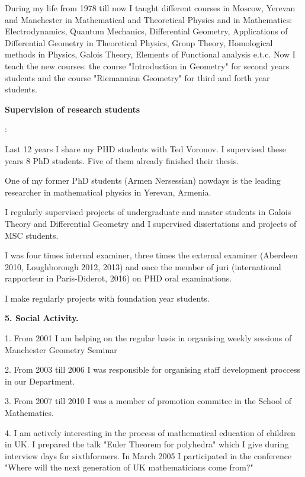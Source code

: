 \documentclass[12pt]{article}
\def\m {\medskip}
\begin{document}
  During my life from 1978 till now I  taught different courses in Moscow,  Yerevan and Manchester in
  Mathematical and Theoretical Physics and
  in Mathematics: Electrodynamics, Quantum Mechanics, Differential Geometry,
Applications of Differential Geometry in Theoretical Physics, Group Theory, Homological methods in Physics,
  Galois Theory, Elements of Functional analysis e.t.c.
   Now I  teach the new courses: the course 
  "Introduction in Geometry" for second years 
students and the course "Riemannian Geometry" for 
third and forth year students.




\m



 \centerline {\bf  Supervision of research students}:


  Last 12 years I share my PHD students with Ted Voronov.
   I supervised these years 8 PhD students. Five of them already 
finished their thesis.

 One of my former PhD students (Armen Nersessian) nowdays is the leading researcher
 in mathematical physics in Yerevan, Armenia.


   I regularly supervised projects of undergraduate and master students in
  Galois Theory and Differential Geometry and I supervised
  dissertations and projects of MSC students. 


  I was four times internal examiner,
 three times the external examiner 
(Aberdeen 2010, Loughborough 2012, 2013)
and once the member of juri 
(international rapporteur in Paris-Diderot, 2016)
  on PHD oral examinations.

 I make regularly projects with foundation year students.

 \begin{center}
   \large \bf 5. Social Activity.
   \end{center}


  1. From 2001 I am helping on the regular basis in organising
  weekly sessions of Manchester  Geometry Seminar

   2. From 2003 till 2006 I was responsible for organising staff development proccess
   in our Department.

   3. From 2007 till 2010 I was  a member of promotion 
   commitee in the School of Mathematics.

  4. I am actively interesting in the process of mathematical education
    of children in UK. I prepared the talk "Euler Theorem for polyhedra"
    which I give during interview days for sixthformers.
   In March 2005 I participated in the conference
  "Where will the next generation of UK mathematicians come from?"
\end{document}
